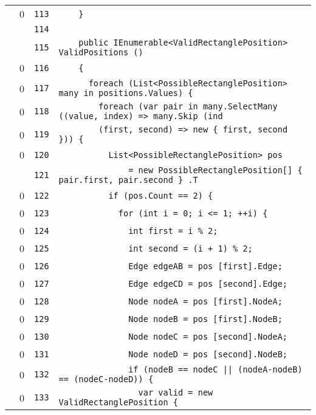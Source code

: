 \documentclass[a4paper,10pt]{article}
\begin{document}
\begin{longtable}[l]{lrrl}
\cellcolor{red} & 0 & \verb~113~ & \verb~    }~\\
\cellcolor{gray} &  & \verb~114~ & \verb~~\\
\cellcolor{gray} &  & \verb~115~ & \verb~    public IEnumerable<ValidRectanglePosition> ValidPositions ()~\\
\cellcolor{red} & 0 & \verb~116~ & \verb~    {~\\
\cellcolor{red} & 0 & \verb~117~ & \verb~      foreach (List<PossibleRectanglePosition> many in positions.Values) {~\\
\cellcolor{red} & 0 & \verb~118~ & \verb~        foreach (var pair in many.SelectMany ((value, index) => many.Skip (ind~\\
\cellcolor{red} & 0 & \verb~119~ & \verb~        (first, second) => new { first, second })) {~\\
\cellcolor{red} & 0 & \verb~120~ & \verb~          List<PossibleRectanglePosition> pos~\\
\cellcolor{gray} &  & \verb~121~ & \verb~              = new PossibleRectanglePosition[] { pair.first, pair.second } .T~\\
\cellcolor{red} & 0 & \verb~122~ & \verb~          if (pos.Count == 2) {~\\
\cellcolor{red} & 0 & \verb~123~ & \verb~            for (int i = 0; i <= 1; ++i) {~\\
\cellcolor{red} & 0 & \verb~124~ & \verb~              int first = i % 2;~\\
\cellcolor{red} & 0 & \verb~125~ & \verb~              int second = (i + 1) % 2;~\\
\cellcolor{red} & 0 & \verb~126~ & \verb~              Edge edgeAB = pos [first].Edge;~\\
\cellcolor{red} & 0 & \verb~127~ & \verb~              Edge edgeCD = pos [second].Edge;~\\
\cellcolor{red} & 0 & \verb~128~ & \verb~              Node nodeA = pos [first].NodeA;~\\
\cellcolor{red} & 0 & \verb~129~ & \verb~              Node nodeB = pos [first].NodeB;~\\
\cellcolor{red} & 0 & \verb~130~ & \verb~              Node nodeC = pos [second].NodeA;~\\
\cellcolor{red} & 0 & \verb~131~ & \verb~              Node nodeD = pos [second].NodeB;~\\
\cellcolor{red} & 0 & \verb~132~ & \verb~              if (nodeB == nodeC || (nodeA-nodeB) == (nodeC-nodeD)) {~\\
\cellcolor{red} & 0 & \verb~133~ & \verb~                var valid = new ValidRectanglePosition {~\\

\end{longtable}
\end{document}
